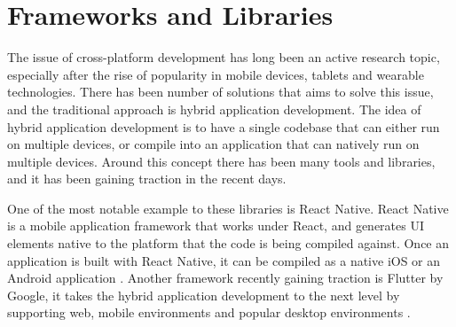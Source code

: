 
\section{Frameworks and Libraries} \label{relatedTools}

The issue of cross-platform development has long been an active research topic, especially after the rise of popularity in mobile devices, tablets and wearable technologies. There has been number of solutions that aims to solve this issue, and the traditional approach is hybrid application development. The idea of hybrid application development is to have a single codebase that can either run on multiple devices, or compile into an application that can natively run on multiple devices. Around this concept there has been many tools and libraries, and it has been gaining traction in the recent days.

One of the most notable example to these libraries is React Native. React Native is a mobile application framework that works under React, and generates UI elements native to the platform that the code is being compiled against. Once an application is built with React Native, it can be compiled as a native iOS or an Android application \cite{ReactNative}. Another framework recently gaining traction is Flutter by Google, it takes the hybrid application development to the next level by supporting web, mobile environments and popular desktop environments \cite{Flutter}.

